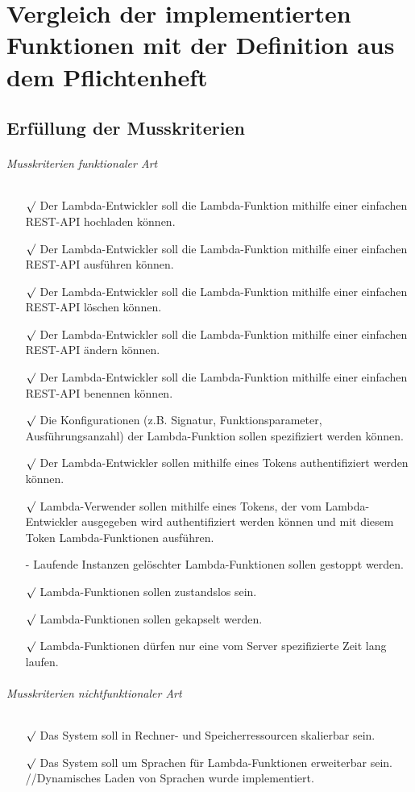 \documentclass[a4paper,20pt,oneside]{book}
\begin{document}
	\chapter{Vergleich der implementierten Funktionen mit der Definition aus dem Pflichtenheft}
	\section{Erfüllung der Musskriterien}
	\subparagraph{Musskriterien funktionaler Art}
	\begin{itemize}
		\item[$\surd$] Der Lambda-Entwickler soll die Lambda-Funktion mithilfe einer einfachen REST-API hochladen können.
		\item[$\surd$] Der Lambda-Entwickler soll die Lambda-Funktion mithilfe einer einfachen REST-API ausführen können.
		\item[$\surd$] Der Lambda-Entwickler soll die Lambda-Funktion mithilfe einer einfachen REST-API löschen können.
		\item[$\surd$] Der Lambda-Entwickler soll die Lambda-Funktion mithilfe einer einfachen REST-API ändern können.
		\item[$\surd$] Der Lambda-Entwickler soll die Lambda-Funktion mithilfe einer einfachen REST-API benennen können.
		\item[$\surd$] Die Konfigurationen (z.B. Signatur, Funktionsparameter, Ausführungsanzahl) der Lambda-Funktion sollen spezifiziert werden können.
		\item[$\surd$] Der Lambda-Entwickler sollen mithilfe eines Tokens authentifiziert werden können.
		\item[$\surd$] Lambda-Verwender sollen mithilfe eines Tokens, der vom Lambda-Entwickler ausgegeben wird authentifiziert werden können und mit diesem Token Lambda-Funktionen ausführen.
		\item[-] Laufende Instanzen gelöschter Lambda-Funktionen sollen gestoppt werden.
		\item[$\surd$] Lambda-Funktionen sollen zustandslos sein.
		\item[$\surd$] Lambda-Funktionen sollen gekapselt werden.
		\item[$\surd$] Lambda-Funktionen dürfen nur eine vom Server spezifizierte Zeit lang laufen.
	\end{itemize}
	\subparagraph{Musskriterien nichtfunktionaler Art}
	\begin{itemize}
		\item[$\surd$] Das System soll in Rechner- und Speicherressourcen skalierbar sein.
		\item[$\surd$] Das System soll um Sprachen für Lambda-Funktionen erweiterbar sein. //Dynamisches Laden von Sprachen wurde implementiert.
	\end{itemize}
\end{document}
